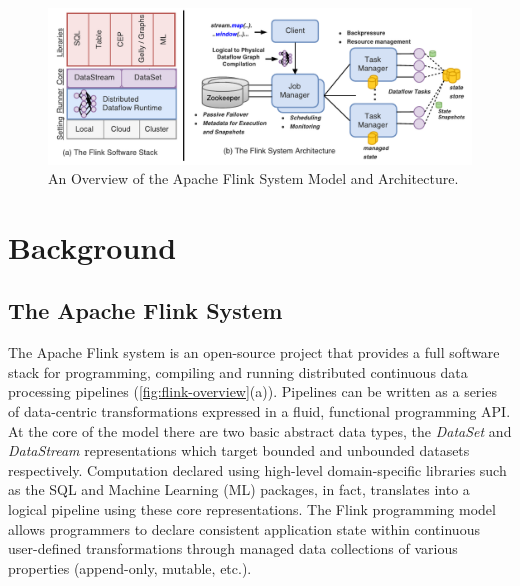 
\begin{figure}[t!]
\centering
\includegraphics[width=\textwidth]{figures/flinkoverview.pdf}
\caption{An Overview of the Apache Flink System Model and Architecture.} 
\label{fig:flink-overview}
\vspace{-4mm}
\end{figure}

\section{Background}

\subsection{The Apache Flink System}

The Apache Flink system \cite{CUSTOM:web/Flink} is an open-source project that provides a full software stack for programming, compiling and running distributed continuous data processing pipelines (\autoref{fig:flink-overview}(a)). Pipelines can be written as a series of data-centric transformations expressed in a fluid, functional programming API. At the core of the model there are two basic abstract data types, the \emph{DataSet} and \emph{DataStream} representations which target bounded and unbounded datasets respectively. Computation declared using high-level domain-specific libraries such as the SQL and Machine Learning (ML) packages, in fact, translates into a logical pipeline using these core representations. The Flink programming model allows programmers to declare consistent application state within continuous user-defined transformations through managed data collections of various properties (append-only, mutable, etc.). 

